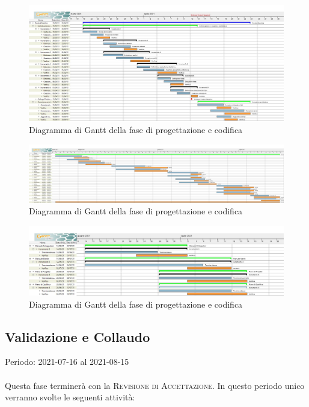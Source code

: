 \documentclass[../piano_di_progetto.tex]{subfiles}
\begin{document}
\begin{figure}[H]
    \centering
    \includegraphics[width=18cm]{src/img/gantt/redazione_architettura_RQ.jpg}
    \caption{Diagramma di Gantt della fase di progettazione e codifica}

\end{figure}

\begin{figure}[H]
    \centering
    \includegraphics[width=18cm]{src/img/gantt/stesura_codiceRQ.jpg}
    \caption{Diagramma di Gantt della fase di progettazione e codifica}

\end{figure}

\begin{figure}[H]
    \centering
    \includegraphics[width=18cm]{src/img/gantt/documenti_RQ_parte2.jpg}
    \caption{Diagramma di Gantt della fase di progettazione e codifica}
\end{figure}


\subsection{Validazione e Collaudo}%
\label{sub:valid_coll}
Periodo: 2021-07-16 al 2021-08-15 \\ \\ 
Questa fase terminerà con la \textsc{Revisione di Accettazione}. In questo periodo unico verranno svolte le seguenti attività:
\end{document}
